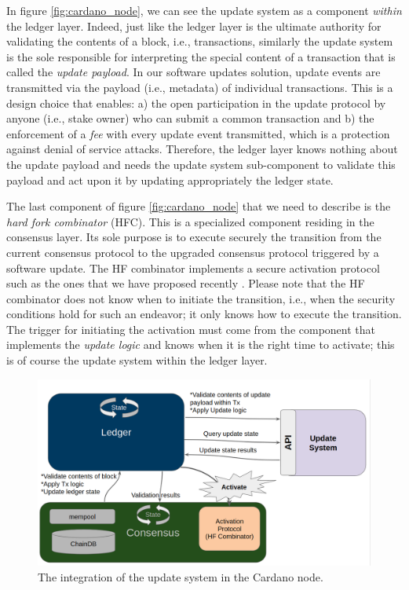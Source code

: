 In figure \ref{fig:cardano_node}, we can see the update system as a component 
\emph{within} the ledger layer. Indeed, just like the ledger layer is the 
ultimate authority for validating the contents of a block, i.e., transactions, 
similarly the update system is the sole responsible for interpreting the 
special content of a transaction that is called the \emph{update payload}. In 
our software updates solution, update events are transmitted via the payload 
(i.e., metadata) of individual transactions. This is a design choice that 
enables: a) the open participation in the update protocol by anyone (i.e., 
stake owner) who can submit a common transaction and b) the enforcement of a 
\emph{fee} with every update event transmitted, which is a protection against 
denial of service attacks. Therefore, the ledger layer knows nothing about the 
update payload and needs the update system sub-component to validate this 
payload and act upon it by updating appropriately the ledger state.

The last component of figure \ref{fig:cardano_node} that we need to describe is 
the \emph{hard fork combinator} (HFC). This is a specialized 
component residing in the consensus layer. Its sole purpose is to execute 
securely the transition from the current consensus protocol to the upgraded 
consensus protocol triggered by a software update. The HF combinator implements 
a secure activation protocol such as the ones that we have proposed recently 
\cite{secure_activation}. Please note that the HF combinator does not know when 
to initiate the transition, i.e., when the security conditions hold for such an 
endeavor; it only knows how to execute the transition. The trigger for 
initiating the activation must come from the component that implements the 
\emph{update logic} and knows when it is the right time to activate; this is of 
course the update system within the ledger layer.

\begin{figure}[h!] %
	\centering
	\includegraphics[width=0.8\columnwidth,
	keepaspectratio]{figures/cardano_node_integration.png}
	\caption{The integration of the update system in the Cardano node.}
	\label{fig:cardano_node_integation}
\end{figure}


